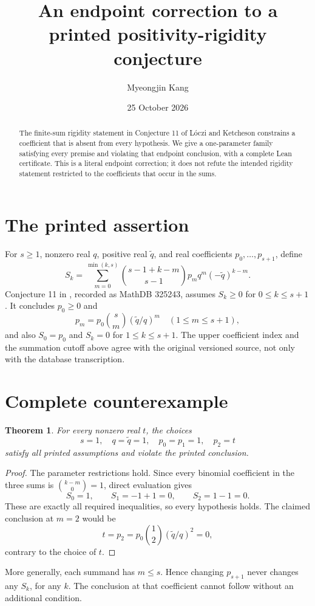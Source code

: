 \documentclass[11pt]{article}
\title{An endpoint correction to a printed positivity-rigidity conjecture}
\author{Myeongjin Kang}
\date{25 October 2026}
\newtheorem{theorem}{Theorem}
\begin{document}
\maketitle
\begin{abstract}
The finite-sum rigidity statement in Conjecture 11 of Lóczi and Ketcheson constrains a coefficient that is absent from every hypothesis. We give a one-parameter family satisfying every premise and violating that endpoint conclusion, with a complete Lean certificate. This is a literal endpoint correction; it does not refute the intended rigidity statement restricted to the coefficients that occur in the sums.
\end{abstract}
\section{The printed assertion}
For $s\geq1$, nonzero real $q$, positive real $\widetilde q$, and real coefficients $p_0,\ldots,p_{s+1}$, define
\[
 S_k=\sum_{m=0}^{\min(k,s)}\binom{s-1+k-m}{s-1}p_mq^m(-\widetilde q)^{k-m}.
\]
Conjecture 11 in \cite{source}, recorded as MathDB 325243, assumes $S_k\geq0$ for $0\leq k\leq s+1$. It concludes $p_0\geq0$ and
\[
 p_m=p_0\binom{s}{m}(\widetilde q/q)^m\quad(1\leq m\leq s+1),
\]
and also $S_0=p_0$ and $S_k=0$ for $1\leq k\leq s+1$.
The upper coefficient index and the summation cutoff above agree with the original versioned source, not only with the database transcription.
\section{Complete counterexample}
\begin{theorem}
For every nonzero real $t$, the choices
\[
 s=1,\quad q=\widetilde q=1,\quad p_0=p_1=1,\quad p_2=t
\]
satisfy all printed assumptions and violate the printed conclusion.
\end{theorem}
\begin{proof}
The parameter restrictions hold. Since every binomial coefficient in the three sums is $\binom{k-m}{0}=1$, direct evaluation gives
\[
 S_0=1,\qquad S_1=-1+1=0,\qquad S_2=1-1=0.
\]
These are exactly all required inequalities, so every hypothesis holds. The claimed conclusion at $m=2$ would be
\[
 t=p_2=p_0\binom12(\widetilde q/q)^2=0,
\]
contrary to the choice of $t$.
\end{proof}
More generally, each summand has $m\leq s$. Hence changing $p_{s+1}$ never changes any $S_k$, for any $k$. The conclusion at that coefficient cannot follow without an additional condition.
\end{document}
